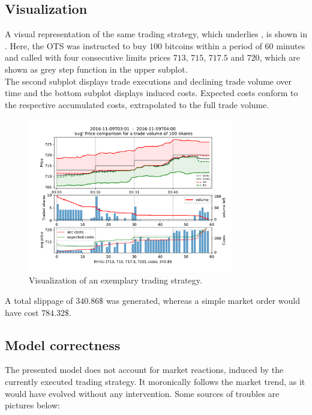 \subsection{Visualization}
A visual representation of the same trading strategy, which underlies , is shown in . Here, the \ac{OTS} was instructed to buy $100$ bitcoins within a period of $60$ minutes and called with four consecutive limits prices $713$, $715$, $717.5$ and $720$, which are shown as grey step function in the upper subplot.\\

The second subplot displays trade executions and declining trade volume over time and the bottom subplot displays induced costs. Expected costs conform to the respective accumulated costs, extrapolated to the full trade volume.


\begin{figure}[ht]
	\centering
   \includegraphics[width=0.8\textwidth]{content/drawings/trading_example17_good}
	\caption{Visualization of an exemplary trading strategy.}
	\label{fig:tradingstrategy17good}
\end{figure}

A total slippage of $340.86\$$ was generated, whereas a simple market order would have cost $784.32\$$.


\subsection{Model correctness}
\label{chap:modelcorrectness}
The presented model does not account for market reactions, induced by the currently executed trading strategy. It moronically follows the market trend, as it would have evolved without any intervention. Some sources of troubles are pictures below:

